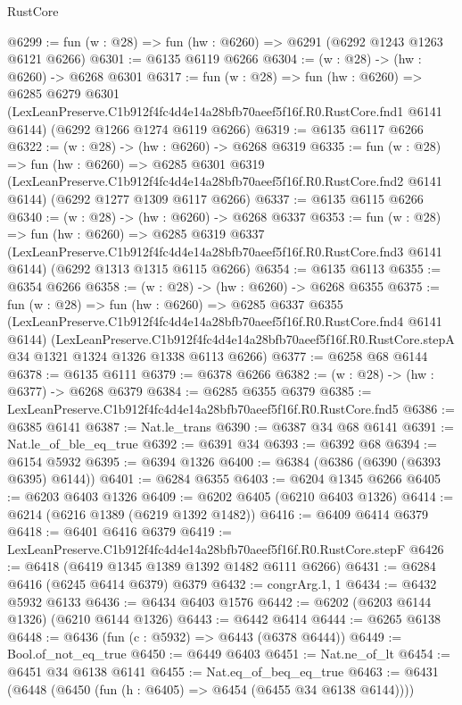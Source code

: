 \begin{lexlean}{RustCore}
\begin{coremodule}
@6299 := fun (w : @28) => fun (hw : @6260) => @6291 (@6292 @1243 @1263 @6121 @6266)
@6301 := @6135 @6119 @6266
@6304 := (w : @28) -> (hw : @6260) -> @6268 @6301
@6317 := fun (w : @28) =>
  fun (hw : @6260) =>
  @6285
    @6279
    @6301
    (LexLeanPreserve.C1b912f4fc4d4e14a28bfb70aeef5f16f.R0.RustCore.fnd1 @6141 @6144)
    (@6292 @1266 @1274 @6119 @6266)
@6319 := @6135 @6117 @6266
@6322 := (w : @28) -> (hw : @6260) -> @6268 @6319
@6335 := fun (w : @28) =>
  fun (hw : @6260) =>
  @6285
    @6301
    @6319
    (LexLeanPreserve.C1b912f4fc4d4e14a28bfb70aeef5f16f.R0.RustCore.fnd2 @6141 @6144)
    (@6292 @1277 @1309 @6117 @6266)
@6337 := @6135 @6115 @6266
@6340 := (w : @28) -> (hw : @6260) -> @6268 @6337
@6353 := fun (w : @28) =>
  fun (hw : @6260) =>
  @6285
    @6319
    @6337
    (LexLeanPreserve.C1b912f4fc4d4e14a28bfb70aeef5f16f.R0.RustCore.fnd3 @6141 @6144)
    (@6292 @1313 @1315 @6115 @6266)
@6354 := @6135 @6113
@6355 := @6354 @6266
@6358 := (w : @28) -> (hw : @6260) -> @6268 @6355
@6375 := fun (w : @28) =>
  fun (hw : @6260) =>
  @6285
    @6337
    @6355
    (LexLeanPreserve.C1b912f4fc4d4e14a28bfb70aeef5f16f.R0.RustCore.fnd4 @6141 @6144)
    (LexLeanPreserve.C1b912f4fc4d4e14a28bfb70aeef5f16f.R0.RustCore.stepA
      @34
      @1321
      @1324
      @1326
      @1338
      @6113
      @6266)
@6377 := @6258 @68 @6144
@6378 := @6135 @6111
@6379 := @6378 @6266
@6382 := (w : @28) -> (hw : @6377) -> @6268 @6379
@6384 := @6285 @6355 @6379
@6385 := LexLeanPreserve.C1b912f4fc4d4e14a28bfb70aeef5f16f.R0.RustCore.fnd5
@6386 := @6385 @6141
@6387 := Nat.le_trans
@6390 := @6387 @34 @68 @6141
@6391 := Nat.le_of_ble_eq_true
@6392 := @6391 @34
@6393 := @6392 @68
@6394 := @6154 @5932
@6395 := @6394 @1326
@6400 := @6384 (@6386 (@6390 (@6393 @6395) @6144))
@6401 := @6284 @6355
@6403 := @6204 @1345 @6266
@6405 := @6203 @6403 @1326
@6409 := @6202 @6405 (@6210 @6403 @1326)
@6414 := @6214 (@6216 @1389 (@6219 @1392 @1482))
@6416 := @6409 @6414 @6379
@6418 := @6401 @6416 @6379
@6419 := LexLeanPreserve.C1b912f4fc4d4e14a28bfb70aeef5f16f.R0.RustCore.stepF
@6426 := @6418 (@6419 @1345 @1389 @1392 @1482 @6111 @6266)
@6431 := @6284 @6416 (@6245 @6414 @6379) @6379
@6432 := congrArg.{1, 1}
@6434 := @6432 @5932 @6133
@6436 := @6434 @6403 @1576
@6442 := @6202 (@6203 @6144 @1326) (@6210 @6144 @1326)
@6443 := @6442 @6414
@6444 := @6265 @6138
@6448 := @6436 (fun (c : @5932) => @6443 (@6378 @6444))
@6449 := Bool.of_not_eq_true
@6450 := @6449 @6403
@6451 := Nat.ne_of_lt
@6454 := @6451 @34 @6138 @6141
@6455 := Nat.eq_of_beq_eq_true
@6463 := @6431 (@6448 (@6450 (fun (h : @6405) => @6454 (@6455 @34 @6138 @6144))))

\end{coremodule}
\end{lexlean}
